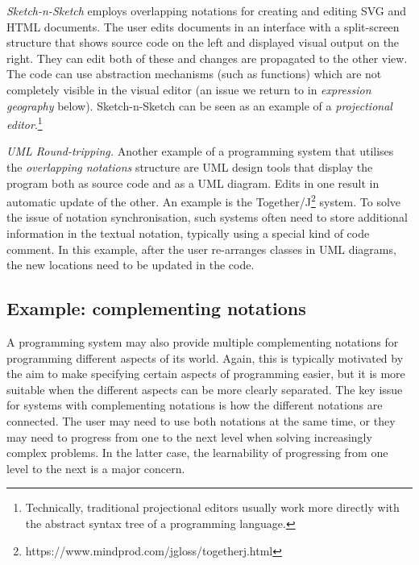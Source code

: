 \documentclass[ twoside,openright,titlepage,numbers=noenddot,headinclude,footinclude,cleardoublepage=empty,abstract=on,
                BCOR=5mm,paper=a4,fontsize=11pt
                ]{scrreprt}
\newcommand{\note}[1]{}
\theoremstyle{definition}
\begin{document}
\emph{Sketch-n-Sketch} \parencite{SnS} employs overlapping notations for
creating and editing SVG and HTML documents. The user edits documents in
an interface with a split-screen structure that shows source code on the
left and displayed visual output on the right. They can edit both of
these and changes are propagated to the other view. The code can use
abstraction mechanisms (such as functions) which are not completely
visible in the visual editor (an issue we return to in \emph{expression
geography} below). Sketch-n-Sketch can be seen as an example of a
\emph{projectional editor}.\footnote{Technically, traditional
  projectional editors usually work more directly with the abstract
  syntax tree of a programming
  language.\note{TODO: Insert some more references to research on "projectional editors"}}

\emph{UML Round-tripping.} Another example of a programming system that
utilises the \emph{overlapping notations} structure are UML design tools
that display the program both as source code and as a UML diagram. Edits
in one result in automatic update of the other. An example is the
Together/J\footnote{https://www.mindprod.com/jgloss/togetherj.html}
system. To solve the issue of notation synchronisation, such systems
often need to store additional information in the textual notation,
typically using a special kind of code comment. In this example, after
the user re-arranges classes in UML diagrams, the new locations need to
be updated in the code.

\hypertarget{example-complementing-notations}{\subsection{Example: complementing
notations}\label{example-complementing-notations}}

A programming system may also provide multiple complementing notations
for programming different aspects of its world. Again, this is typically
motivated by the aim to make specifying certain aspects of programming
easier, but it is more suitable when the different aspects can be more
clearly separated. The key issue for systems with complementing
notations is how the different notations are connected. The user may
need to use both notations at the same time, or they may need to
progress from one to the next level when solving increasingly complex
problems. In the latter case, the learnability of progressing from one
level to the next is a major concern.
\end{document}
